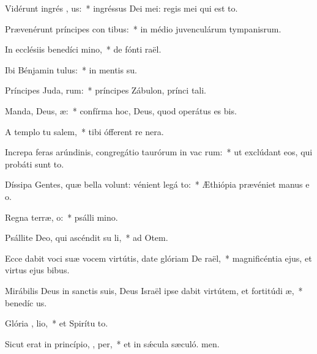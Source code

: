 \item Vidérunt ingrés , us:~* ingréssus Dei mei: regis mei qui est  to.
\item Prævenérunt príncipes con tibus:~* in médio juvenculárum tympanisrum.
\item In ecclésiis benedíci  mino,~* de fónti raël.
\item Ibi Bénjamin tulus:~* in mentis su.
\item Príncipes Juda,  rum:~* príncipes Zábulon, prínci tali.
\item Manda, Deus,  æ:~* confírma hoc, Deus, quod operátus es  bis.
\item A templo tu  salem,~* tibi ófferent re nera.
\item Increpa feras arúndinis, congregátio taurórum in vac rum:~* ut exclúdant eos, qui probáti sunt to.
\item Díssipa Gentes, quæ bella volunt: vénient legá  to:~* Æthiópia prævéniet manus e o.
\item Regna terræ,  o:~* psálli mino.
\item Psállite Deo, qui ascéndit su  li,~* ad Otem.
\item Ecce dabit voci suæ vocem virtútis, date glóriam De  raël,~* magnificéntia ejus, et virtus ejus  bibus.
\item Mirábilis Deus in sanctis suis, Deus Israël ipse dabit virtútem, et fortitúdi  æ,~* benedíc us.
\item Glória ,  lio,~* et Spirítu to.
\item Sicut erat in princípio,  ,  per,~* et in sǽcula sæculó. men.
